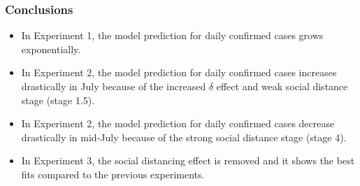 \documentclass[aspectratio=169, 9pt, xcolor=dvipsnames]{beamer}
\begin{document}
	\begin{frame}\frametitle{Conclusions}
	    \begin{itemize}
	    	\item In Experiment 1, the model prediction for daily confirmed cases grows exponentially.
	    	\item In Experiment 2, the model prediction for daily confirmed cases increases drastically in July because of the increased $\delta$ effect and weak social distance stage (stage 1.5).
	    	\item In Experiment 2, the model prediction for daily confirmed cases decrease drastically in mid-July because of the strong social distance stage (stage 4).
	    	\item In Experiment 3, the social distancing effect is removed and it shows the best fits compared to the previous experiments.
	    \end{itemize}
	\end{frame}
\end{document}
